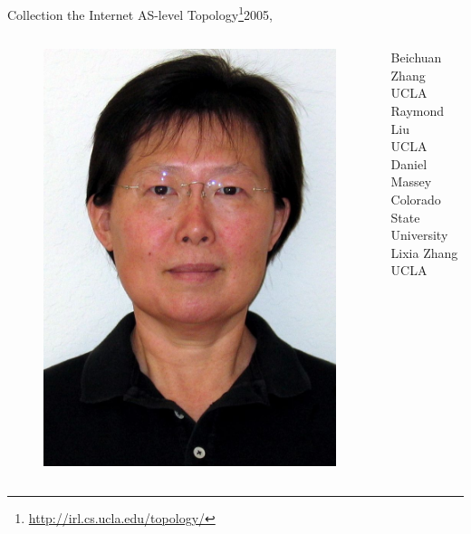 \documentclass[ngerman,compress,hyperref={bookmarks}]{beamer}
\begin{document}
\begin{frame}{Collection the Internet AS-level Topology\footnote{\url{http://irl.cs.ucla.edu/topology/}}}{2005, \cite{Zhang:2005:CIA:1052812.1052825}}
\begin{columns}[c]
\begin{column}{0.08\textwidth}
\begin{figure}
        \includegraphics[width=1\textwidth]{images/zhang_l}
      \end{figure}
    \end{column}
    \begin{column}{0.3\textwidth}
      {\scriptsize Beichuan Zhang\\
      \vspace{0.1cm}
      UCLA\\
      \vspace{0.7cm}
      Raymond Liu\\
      \vspace{0.1cm}
      UCLA\\
      \vspace{0.3cm}
      Daniel Massey\\
      \vspace{0.1cm}
      Colorado State University\\
      \vspace{0.3cm}
      Lixia Zhang\\
      \vspace{0.1cm}
      UCLA\\ }
    \end{column}
  \end{columns}
\end{frame}
\end{document}
